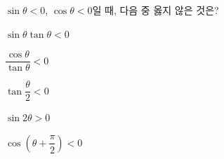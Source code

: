 $\sin\theta<0$, $\cos\theta<0$일 때, 다음 중 옳지 않은 것은? 
\begin{choicesii}{\rule[-3ex]{0pt}{8ex}$\sin\theta\tan\theta<0$}{\rule[-3ex]{0pt}{8ex}$\dfrac{\cos\theta}{\tan\theta}<0$}{\rule[-3ex]{0pt}{8ex}$\tan\dfrac{\theta}{2}<0$}{\rule[-3ex]{0pt}{8ex}$\sin 2\theta>0$}{\rule[-3ex]{0pt}{8ex}$\cos\left(\theta+\dfrac{\pi}{2}\right)<0$}\end{choicesii}

